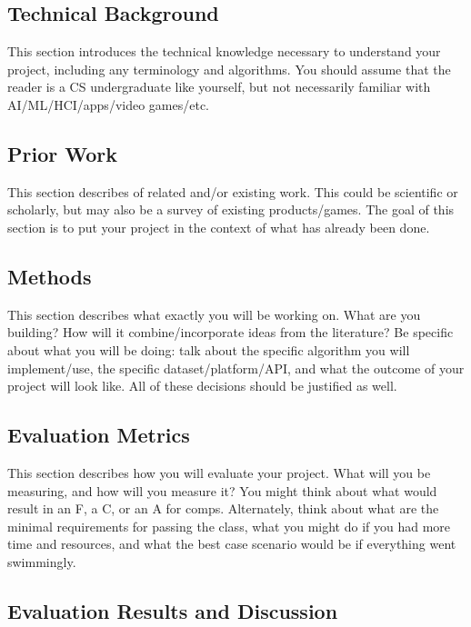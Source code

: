 \documentclass[10pt,twocolumn]{article}
\begin{document}
\subsection{Technical Background}

This section introduces the technical knowledge necessary to understand your project, including any terminology and algorithms.
You should assume that the reader is a CS undergraduate like yourself, but not necessarily familiar with AI/ML/HCI/apps/video games/etc.

\subsection{Prior Work}

This section describes of related and/or existing work.
This could be scientific or scholarly, but may also be a survey of existing products/games.
The goal of this section is to put your project in the context of what has already been done.

\subsection{Methods}

This section describes what exactly you will be working on.
What are you building? How will it combine/incorporate ideas from the literature? Be specific about what you will be doing: talk about the specific algorithm you will implement/use, the specific dataset/platform/API, and what the outcome of your project will look like.
All of these decisions should be justified as well.

\subsection{Evaluation Metrics}

This section describes how you will evaluate your project.
What will you be measuring, and how will you measure it?
You might think about what would result in an F, a C, or an A for comps.
Alternately, think about what are the minimal requirements for passing the class, what you might do if you had more time and resources, and what the best case scenario would be if everything went swimmingly.

\subsection{Evaluation Results and Discussion}
\end{document}
